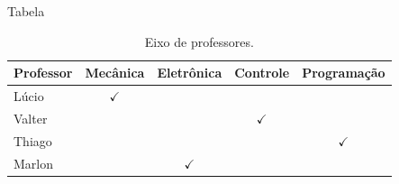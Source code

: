 \begin{slide}{Tabela}
  \begin{table}
    \begin{tabular}{l|c|c|c|c} %
      \toprule
      Professor & Mecânica       & Eletrônica     & Controle       & Programação    \\ \midrule
      Lúcio     & \(\checkmark\) &                &                &                \\
      Valter    &                &                & \(\checkmark\) &                \\
      Thiago    &                &                &                & \(\checkmark\) \\
      Marlon    &                & \(\checkmark\) &                &                \\
      \bottomrule
    \end{tabular}
    \caption{Eixo de professores.}
  \end{table}
\end{slide}
